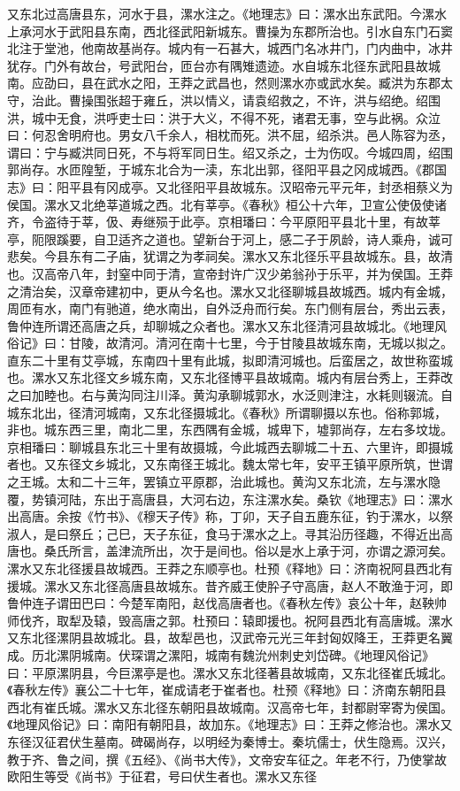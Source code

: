 \documentclass[12pt,UTF8]{ctexbook}
\begin{document}
又东北过高唐县东，河水于县，漯水注之。《地理志》曰：漯水出东武阳。今漯水上承河水于武阳县东南，西北径武阳新城东。曹操为东郡所治也。引水自东门石窦北注于堂池，他南故基尚存。城内有一石甚大，城西门名冰井门，门内曲中，冰井犹存。门外有故台，号武阳台，匝台亦有隅雉遗迹。水自城东北径东武阳县故城南。应劭曰，县在武水之阳，王莽之武昌也，然则漯水亦或武水矣。臧洪为东郡太守，治此。曹操围张超于雍丘，洪以情义，请袁绍救之，不许，洪与绍绝。绍围洪，城中无食，洪呼吏士曰：洪于大义，不得不死，诸君无事，空与此祸。众泣曰：何忍舍明府也。男女八千余人，相枕而死。洪不屈，绍杀洪。邑人陈容为丞，谓曰：宁与臧洪同日死，不与将军同日生。绍又杀之，士为伤叹。今城四周，绍围郭尚存。水匝隍堑，于城东北合为一渎，东北出郭，径阳平县之冈成城西。《郡国志》曰：阳平县有冈成亭。又北径阳平县故城东。汉昭帝元平元年，封丞相蔡义为侯国。漯水又北绝莘道城之西。北有莘亭。《春秋》桓公十六年，卫宣公使伋使诸齐，令盗待于莘，伋、寿继殒于此亭。京相璠曰：今平原阳平县北十里，有故莘亭，阨限蹊要，自卫适齐之道也。望新台于河上，感二子于夙龄，诗人乘舟，诚可悲矣。今县东有二子庙，犹谓之为孝祠矣。漯水又东北径乐平县故城东。县，故清也。汉高帝八年，封窒中同于清，宣帝封许广汉少弟翁孙于乐平，并为侯国。王莽之清治矣，汉章帝建初中，更从今名也。漯水又北径聊城县故城西。城内有金城，周匝有水，南门有驰道，绝水南出，自外泛舟而行矣。东门侧有层台，秀出云表，鲁仲连所谓还高唐之兵，却聊城之众者也。漯水又东北径清河县故城北。《地理风俗记》曰：甘陵，故清河。清河在南十七里，今于甘陵县故城东南，无城以拟之。直东二十里有艾亭城，东南四十里有此城，拟即清河城也。后蛮居之，故世称蛮城也。漯水又东北径文乡城东南，又东北径博平县故城南。城内有层台秀上，王莽改之曰加睦也。右与黄沟同注川泽。黄沟承聊城郭水，水泛则津注，水耗则辍流。自城东北出，径清河城南，又东北径摄城北。《春秋》所谓聊摄以东也。俗称郭城，非也。城东西三里，南北二里，东西隅有金城，城卑下，墟郭尚存，左右多坟垅。京相璠曰：聊城县东北三十里有故摄城，今此城西去聊城二十五、六里许，即摄城者也。又东径文乡城北，又东南径王城北。魏太常七年，安平王镇平原所筑，世谓之王城。太和二十三年，罢镇立平原郡，治此城也。黄沟又东北流，左与漯水隐覆，势镇河陆，东出于高唐县，大河右边，东注漯水矣。桑钦《地理志》曰：漯水出高唐。余按《竹书》、《穆天子传》称，丁卯，天子自五鹿东征，钓于漯水，以祭淑人，是曰祭丘；己巳，天子东征，食马于漯水之上。寻其沿历径趣，不得近出高唐也。桑氏所言，盖津流所出，次于是间也。俗以是水上承于河，亦谓之源河矣。漯水又东北径援县故城西。王莽之东顺亭也。杜预《释地》曰：济南祝阿县西北有援城。漯水又东北径高唐县故城东。昔齐威王使肸子守高唐，赵人不敢渔于河，即鲁仲连子谓田巴曰：今楚军南阳，赵伐高唐者也。《春秋左传》哀公十年，赵鞅帅师伐齐，取犁及辕，毁高唐之郭。杜预曰：辕即援也。祝阿县西北有高唐城。漯水又东北径漯阴县故城北。县，故犁邑也，汉武帝元光三年封匈奴降王，王莽更名翼成。历北漯阴城南。伏琛谓之漯阳，城南有魏沇州刺史刘岱碑。《地理风俗记》曰：平原漯阴县，今巨漯亭是也。漯水又东北径著县故城南，又东北径崔氏城北。《春秋左传》襄公二十七年，崔成请老于崔者也。杜预《释地》曰：济南东朝阳县西北有崔氏城。漯水又东北径东朝阳县故城南。汉高帝七年，封都尉宰寄为侯国。《地理风俗记》曰：南阳有朝阳县，故加东。《地理志》曰：王莽之修治也。漯水又东径汉征君伏生墓南。碑碣尚存，以明经为秦博士。秦坑儒士，伏生隐焉。汉兴，教于齐、鲁之间，撰《五经》、《尚书大传》，文帝安车征之。年老不行，乃使掌故欧阳生等受《尚书》于征君，号曰伏生者也。漯水又东径
\end{document}
